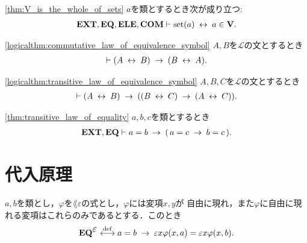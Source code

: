 	\begin{screen}
		\begin{thm}
		\ref{thm:V_is_the_whole_of_sets}
			$a$を類とするとき次が成り立つ:
			\begin{align}
				\mbox{{\bf EXT}},\mbox{{\bf EQ}},\mbox{{\bf ELE}},\mbox{\bf COM} \vdash \operatorname*{set} (a) \hspace{0.25em}\leftrightarrow\hspace{0.25em} a \in \mathbf{V}.
			\end{align}
		\end{thm}
	\end{screen}
	
	\begin{screen}
		\begin{logicalthm}[同値関係の可換律]
		\ref{logicalthm:commutative_law_of_equivalence_symbol}
			$A,B$を$\mathcal{L}$の文とするとき
			\begin{align}
				\vdash (A \hspace{0.25em}\leftrightarrow\hspace{0.25em} B) \hspace{0.25em}\rightarrow\hspace{0.25em} (B \hspace{0.25em}\leftrightarrow\hspace{0.25em} A).
			\end{align}
		\end{logicalthm}
	\end{screen}
	
	\begin{screen}
		\begin{logicalthm}[同値関係の推移律]
		\ref{logicalthm:transitive_law_of_equivalence_symbol}
			$A,B,C$を$\mathcal{L}$の文とするとき
			\begin{align}
				\vdash (A \hspace{0.25em}\leftrightarrow\hspace{0.25em} B) \hspace{0.25em}\rightarrow\hspace{0.25em} ((B \hspace{0.25em}\leftrightarrow\hspace{0.25em} C) \hspace{0.25em}\rightarrow\hspace{0.25em} 
				(A \hspace{0.25em}\leftrightarrow\hspace{0.25em} C)).
			\end{align}
		\end{logicalthm}
	\end{screen}
	
	\begin{screen}
		\begin{thm}[等号の推移律]\ref{thm:transitive_law_of_equality}
			$a,b,c$を類とするとき
			\begin{align}
				\mbox{{\bf EXT}},\mbox{{\bf EQ}} \vdash a = b \hspace{0.25em}\rightarrow\hspace{0.25em} (\, a = c \hspace{0.25em}\rightarrow\hspace{0.25em} b = c\, ).
			\end{align}
		\end{thm}
	\end{screen}
	
\section{代入原理}
	\begin{screen}
		\begin{axm}
			$a,b$を類とし，$\varphi$を$\lang{\varepsilon}$の式とし，$\varphi$には変項$x,y$が
			自由に現れ，また$\varphi$に自由に現れる変項はこれらのみであるとする．このとき
			\begin{align}
				\EQAXEP \defarrow
				a = b \rarrow \varepsilon x \varphi(x,a) = \varepsilon x \varphi(x,b).
			\end{align}
		\end{axm}
	\end{screen}
	
